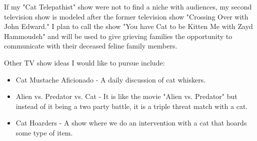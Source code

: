 If my "Cat Telepathist" show were not to find a niche with audiences, my second television show is modeled after the former television show "Crossing Over with John Edward." \cite{calderwood} I plan to call the show "You have Cat to be Kitten Me with Zayd Hammoudeh" and will be used to give grieving families the opportunity to communicate with their deceased feline family members.

Other TV show ideas I would like to pursue include:
\begin{itemize}
	\item Cat Mustache Aficionado - A daily discussion of cat whiskers.
	\item Alien vs. Predator vs. Cat - It is like the movie "Alien vs. Predator" but instead of it being a two party battle, it is a triple threat match with a cat.
	\item Cat Hoarders - A show where we do an intervention with a cat that hoards some type of item.
\end{itemize}